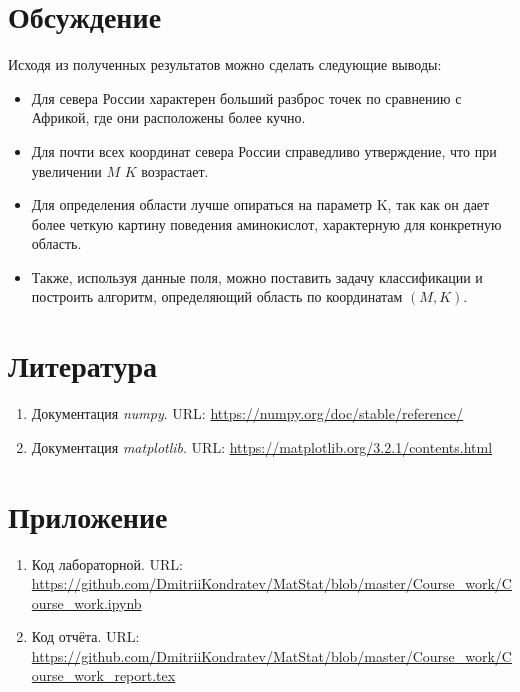 \documentclass[12pt,a4paper]{article}
\begin{document}
	\section{Обсуждение}
	Исходя из полученных результатов можно сделать следующие выводы:
	\begin{itemize}
		\item Для севера России характерен больший разброс точек по сравнению с Африкой, где они расположены более кучно.
		
		\item Для почти всех координат севера России справедливо утверждение, что при увеличении $M$ $K$ возрастает.
		
		\item Для определения области лучше опираться на параметр K, так как он дает более четкую картину поведения аминокислот, характерную для конкретную область.
		
		\item Также, используя данные поля, можно поставить задачу классификации и построить алгоритм, определяющий область по координатам $(M,K)$.
	\end{itemize}
	
	\section{Литература}
	\begin{enumerate}
		\item Документация \emph{numpy}. URL: \url{https://numpy.org/doc/stable/reference/}
		\item Документация \emph{matplotlib}. URL: \url{https://matplotlib.org/3.2.1/contents.html}
	\end{enumerate}

	\section{Приложение}
	\begin{enumerate}
		\item Код лабораторной. URL: \url{https://github.com/DmitriiKondratev/MatStat/blob/master/Course_work/Course_work.ipynb}
		
		\item Код отчёта. URL: \url{https://github.com/DmitriiKondratev/MatStat/blob/master/Course_work/Course_work_report.tex}
		
	\end{enumerate}
\end{document}
